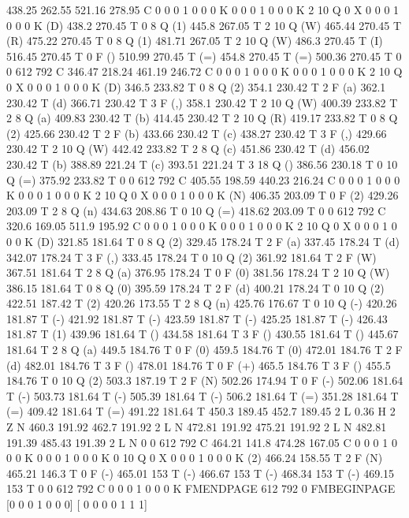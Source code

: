 438.25 262.55 521.16 278.95 C
0 0 0 1 0 0 0 K
0 0 0 1 0 0 0 K
2 10 Q
0 X
0 0 0 1 0 0 0 K
(D) 438.2 270.45 T
0 8 Q
(1) 445.8 267.05 T
2 10 Q
(W) 465.44 270.45 T
(R) 475.22 270.45 T
0 8 Q
(1) 481.71 267.05 T
2 10 Q
(W) 486.3 270.45 T
(I) 516.45 270.45 T
0 F
() 510.99 270.45 T
(=) 454.8 270.45 T
(=) 500.36 270.45 T
0 0 612 792 C
346.47 218.24 461.19 246.72 C
0 0 0 1 0 0 0 K
0 0 0 1 0 0 0 K
2 10 Q
0 X
0 0 0 1 0 0 0 K
(D) 346.5 233.82 T
0 8 Q
(2) 354.1 230.42 T
2 F
(a) 362.1 230.42 T
(d) 366.71 230.42 T
3 F
(,) 358.1 230.42 T
2 10 Q
(W) 400.39 233.82 T
2 8 Q
(a) 409.83 230.42 T
(b) 414.45 230.42 T
2 10 Q
(R) 419.17 233.82 T
0 8 Q
(2) 425.66 230.42 T
2 F
(b) 433.66 230.42 T
(c) 438.27 230.42 T
3 F
(,) 429.66 230.42 T
2 10 Q
(W) 442.42 233.82 T
2 8 Q
(c) 451.86 230.42 T
(d) 456.02 230.42 T
(b) 388.89 221.24 T
(c) 393.51 221.24 T
3 18 Q
() 386.56 230.18 T
0 10 Q
(=) 375.92 233.82 T
0 0 612 792 C
405.55 198.59 440.23 216.24 C
0 0 0 1 0 0 0 K
0 0 0 1 0 0 0 K
2 10 Q
0 X
0 0 0 1 0 0 0 K
(N) 406.35 203.09 T
0 F
(2) 429.26 203.09 T
2 8 Q
(n) 434.63 208.86 T
0 10 Q
(=) 418.62 203.09 T
0 0 612 792 C
320.6 169.05 511.9 195.92 C
0 0 0 1 0 0 0 K
0 0 0 1 0 0 0 K
2 10 Q
0 X
0 0 0 1 0 0 0 K
(D) 321.85 181.64 T
0 8 Q
(2) 329.45 178.24 T
2 F
(a) 337.45 178.24 T
(d) 342.07 178.24 T
3 F
(,) 333.45 178.24 T
0 10 Q
(2) 361.92 181.64 T
2 F
(W) 367.51 181.64 T
2 8 Q
(a) 376.95 178.24 T
0 F
(0) 381.56 178.24 T
2 10 Q
(W) 386.15 181.64 T
0 8 Q
(0) 395.59 178.24 T
2 F
(d) 400.21 178.24 T
0 10 Q
(2) 422.51 187.42 T
(2) 420.26 173.55 T
2 8 Q
(n) 425.76 176.67 T
0 10 Q
(-) 420.26 181.87 T
(-) 421.92 181.87 T
(-) 423.59 181.87 T
(-) 425.25 181.87 T
(-) 426.43 181.87 T
(1) 439.96 181.64 T
() 434.58 181.64 T
3 F
() 430.55 181.64 T
() 445.67 181.64 T
2 8 Q
(a) 449.5 184.76 T
0 F
(0) 459.5 184.76 T
(0) 472.01 184.76 T
2 F
(d) 482.01 184.76 T
3 F
() 478.01 184.76 T
0 F
(+) 465.5 184.76 T
3 F
() 455.5 184.76 T
0 10 Q
(2) 503.3 187.19 T
2 F
(N) 502.26 174.94 T
0 F
(-) 502.06 181.64 T
(-) 503.73 181.64 T
(-) 505.39 181.64 T
(-) 506.2 181.64 T
(=) 351.28 181.64 T
(=) 409.42 181.64 T
(=) 491.22 181.64 T
450.3 189.45 452.7 189.45 2 L
0.36 H
2 Z
N
460.3 191.92 462.7 191.92 2 L
N
472.81 191.92 475.21 191.92 2 L
N
482.81 191.39 485.43 191.39 2 L
N
0 0 612 792 C
464.21 141.8 474.28 167.05 C
0 0 0 1 0 0 0 K
0 0 0 1 0 0 0 K
0 10 Q
0 X
0 0 0 1 0 0 0 K
(2) 466.24 158.55 T
2 F
(N) 465.21 146.3 T
0 F
(-) 465.01 153 T
(-) 466.67 153 T
(-) 468.34 153 T
(-) 469.15 153 T
0 0 612 792 C
0 0 0 1 0 0 0 K
FMENDPAGE
612 792 0 FMBEGINPAGE
[0 0 0 1 0 0 0]
[ 0 0 0 0 1 1 1]
